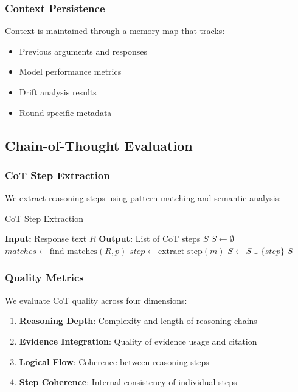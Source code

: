 \documentclass[11pt]{article}
\begin{document}
\subsubsection{Context Persistence}

Context is maintained through a memory map that tracks:
\begin{itemize}
    \item Previous arguments and responses
    \item Model performance metrics
    \item Drift analysis results
    \item Round-specific metadata
\end{itemize}

\subsection{Chain-of-Thought Evaluation}

\subsubsection{CoT Step Extraction}

We extract reasoning steps using pattern matching and semantic analysis:

\begin{algorithm}
\caption{CoT Step Extraction}
\begin{algorithmic}[1]
\STATE \textbf{Input:} Response text $R$
\STATE \textbf{Output:} List of CoT steps $S$
\STATE $S \leftarrow \emptyset$
    \STATE $matches \leftarrow \text{find\_matches}(R, p)$
        \STATE $step \leftarrow \text{extract\_step}(m)$
        \STATE $S \leftarrow S \cup \{step\}$
    \ENDFOR
\ENDFOR
\RETURN $S$
\end{algorithmic}
\end{algorithm}

\subsubsection{Quality Metrics}

We evaluate CoT quality across four dimensions:

\begin{enumerate}
    \item \textbf{Reasoning Depth}: Complexity and length of reasoning chains
    \item \textbf{Evidence Integration}: Quality of evidence usage and citation
    \item \textbf{Logical Flow}: Coherence between reasoning steps
    \item \textbf{Step Coherence}: Internal consistency of individual steps
\end{enumerate}
\end{document}
